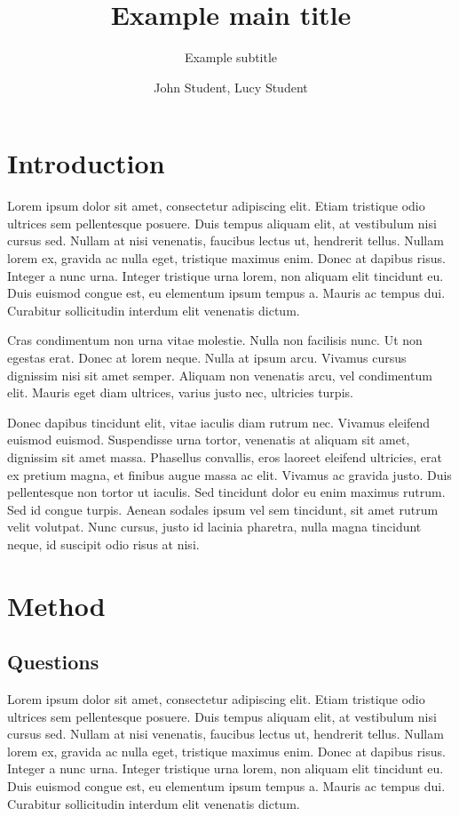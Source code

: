 \documentclass[11pt, a4paper]{JTH}
\title{Example main title}
\subtitle{Example subtitle}
\author{John Student, Lucy Student}
\begin{document}
\maketitle

\tableofcontents

\chapter{Introduction}
\label{chap:introduction}
Lorem ipsum dolor sit amet, consectetur adipiscing elit. Etiam tristique odio ultrices sem pellentesque posuere. Duis tempus aliquam elit, at vestibulum nisi cursus sed. Nullam at nisi venenatis, faucibus lectus ut, hendrerit tellus. Nullam lorem ex, gravida ac nulla eget, tristique maximus enim. Donec at dapibus risus. Integer a nunc urna. Integer tristique urna lorem, non aliquam elit tincidunt eu. Duis euismod congue est, eu elementum ipsum tempus a. Mauris ac tempus dui. Curabitur sollicitudin interdum elit venenatis dictum\cite{davidson1996c}. 

Cras condimentum non urna vitae molestie. Nulla non facilisis nunc. Ut non egestas erat. Donec at lorem neque. Nulla at ipsum arcu. Vivamus cursus dignissim nisi sit amet semper. Aliquam non venenatis arcu, vel condimentum elit. Mauris eget diam ultrices, varius justo nec, ultricies turpis\cite{freeman2002example}.

Donec dapibus tincidunt elit, vitae iaculis diam rutrum nec. Vivamus eleifend euismod euismod. Suspendisse urna tortor, venenatis at aliquam sit amet, dignissim sit amet massa. Phasellus convallis, eros laoreet eleifend ultricies, erat ex pretium magna, et finibus augue massa ac elit. Vivamus ac gravida justo. Duis pellentesque non tortor ut iaculis. Sed tincidunt dolor eu enim maximus rutrum. Sed id congue turpis. Aenean sodales ipsum vel sem tincidunt, sit amet rutrum velit volutpat. Nunc cursus, justo id lacinia pharetra, nulla magna tincidunt neque, id suscipit odio risus at nisi\cite{zloof1977query}.

\chapter{Method}
\label{chap:Method}

\section{Questions}

Lorem ipsum dolor sit amet, consectetur adipiscing elit. Etiam tristique odio ultrices sem pellentesque posuere. Duis tempus aliquam elit, at vestibulum nisi cursus sed. Nullam at nisi venenatis, faucibus lectus ut, hendrerit tellus. Nullam lorem ex, gravida ac nulla eget, tristique maximus enim. Donec at dapibus risus. Integer a nunc urna. Integer tristique urna lorem, non aliquam elit tincidunt eu. Duis euismod congue est, eu elementum ipsum tempus a. Mauris ac tempus dui. Curabitur sollicitudin interdum elit venenatis dictum\cite{beck2003test}.
\end{document}
